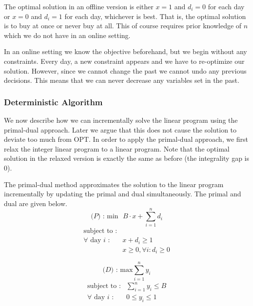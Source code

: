 The optimal solution in an offline version is either $x=1$ and $d_i = 0$ for each day or $x=0$ and $d_i = 1$ for each day, whichever is best.
That is, the optimal solution is to buy at once or never buy at all.
This of course requires prior knowledge of $n$ which we do not have in an online setting.

In an online setting we know the objective beforehand, but we begin without any constraints.
Every day, a new constraint appears and we have to re-optimize our solution.
However, since we cannot change the past we cannot undo any previous decisions.
This means that we can never decrease any variables set in the past.

\subsubsection{Deterministic Algorithm}

We now describe how we can incrementally solve the linear program using the primal-dual approach.
Later we argue that this does not cause the solution to deviate too much from OPT.
In order to apply the primal-dual approach, we first relax the integer linear program to a linear program. Note that the optimal solution in the relaxed version is exactly the same as before (the integrality gap is $0$).

The primal-dual method approximates the solution to the linear program incrementally by updating the primal and dual simultaneously.
The primal and dual are given below.
\[
\textrm{($P$) : min} \textrm{ } B\cdot x + \sum^n_{i=1} d_i
\]
\[
	\begin{array}{lr}
	\textrm{subject to :} & \\
	\textrm{$\forall$ day $i$} \textrm{ :} & x + d_i  \ge 1  \\
			    & x     \geq 0, \forall i : d_i \ge 0

	\end{array}
\]

\vspace{0.6cm}

\[
\textrm{($D$) : max} \sum^n_{i=1} y_i
\]
\[
	\begin{array}{lr}
	\textrm{subject to :} & \sum^n_{i=1} y_i \le B \\
		\textrm{$\forall$ day $i$} \textrm{ :} & 0 \le y_i  \le 1 \\
	\end{array}
\]


